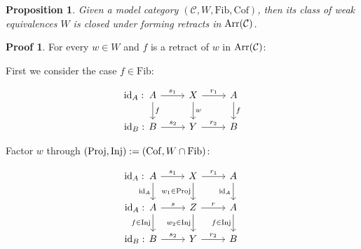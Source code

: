 \documentclass[a4paper]{article}
\theoremstyle{plain}
\newtheorem{prop}[thm]{Proposition}
\theoremstyle{definition}
\newtheorem*{prf}{Proof}
\theoremstyle{remark}
\newcommand{\mc}[1]{\mathcal{#1}}
\newcommand{\mcC}{\mc C}
\newcommand{\id}{\mathrm{id}}
\DeclareMathOperator{\Proj}{\rm{Proj}}
\DeclareMathOperator{\Inj}{\rm{Inj}}
\DeclareMathOperator{\Arr}{\rm{Arr}}
\newcommand{\Cof}{\mathrm{Cof}}
\newcommand{\Fib}{\mathrm{Fib}}
\begin{document}
        \begin{prop}
            Given a model category $(\mcC, W, \Fib, \Cof)$, then its
            class of weak equivalences $W$ is closed under forming retracts in $\Arr(\mcC)$.
        \end{prop}
        \begin{prf}
            \par For every $w \in W$ and $f$ is a retract of $w$ in $\Arr(\mcC)$:
            \par First we consider the case $f \in \Fib$:

            \[\begin{tikzcd}
                A & X & A \\
                B & Y & B
                \arrow["{w}", from=1-2, to=2-2]
                \arrow["r_1", from=1-2, to=1-3]
                \arrow["r_2", from=2-2, to=2-3]
                \arrow["\id_A : \hspace*{2.77cm}"{marking}, "s_1", from=1-1, to=1-2]
                \arrow["\id_B : \hspace*{2.77cm}"{marking}, "s_2",from=2-1, to=2-2]
                \arrow["f", from=1-1, to=2-1]
                \arrow["f", from=1-3, to=2-3]
            \end{tikzcd}\]

            \par Factor $w$ through $(\Proj, \Inj) := (\Cof, W \cap \Fib)$:

            \[\begin{tikzcd}
                A & X & A \\
                A & Z & A \\
                B & Y & B
                \arrow["\id_B : \hspace*{2.77cm}"{marking}, "{s_2}", from=3-1, to=3-2]
                \arrow["{r_2}", from=3-2, to=3-3]
                \arrow["f \in \Inj"', from=2-3, to=3-3]
                \arrow["{w_2 \in \Inj}"', from=2-2, to=3-2]
                \arrow["{w_1 \in \Proj}"', from=1-2, to=2-2]
                \arrow["\id_A"', from=1-3, to=2-3]
                \arrow["\id_A"', from=1-1, to=2-1]
                \arrow["f \in \Inj"', from=2-1, to=3-1]
                \arrow["\id_A : \hspace*{2.77cm}"{marking}, "{s_1}", from=1-1, to=1-2]
                \arrow["{r_1}", from=1-2, to=1-3]
                \arrow["\id_A : \hspace*{2.77cm}"{marking}, "s", from=2-1, to=2-2]
                \arrow["r", from=2-2, to=2-3]
            \end{tikzcd}\]
            


\end{prf}
\end{document}
